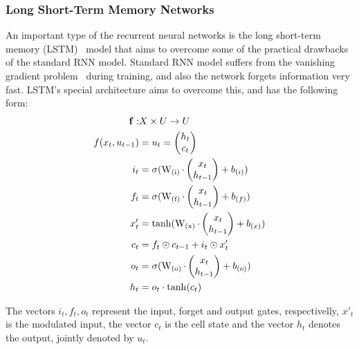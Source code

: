 \documentclass[runningheads,a4paper]{llncs}
\begin{document}
\subsubsection{Long Short-Term Memory Networks}
\label{sec:lstm}
An important type of the recurrent neural networks is the long short-term memory (LSTM)~\cite{hochreiter1997long} model that aims to overcome some of the practical drawbacks of the standard RNN model. Standard RNN model suffers from the vanishing gradient problem~\cite{bengio1994learning} during training, and also the network forgets information very fast. LSTM's special architecture aims to overcome this, and has the following form:
\begin{align*}
\bf{f}: & X \times U \rightarrow U \\ %
f(x_t, u_{t-1}) & = u_t = \begin{pmatrix}
h_t \\
c_t
\end{pmatrix} \\
i_t &= \sigma(\operatorname{W_{(i)}} \cdot \begin{pmatrix}
x_t \\
h_{t-1}
\end{pmatrix} + b_{(i)}) \\
f_t &= \sigma(\operatorname{W_{(f)}} \cdot \begin{pmatrix}
x_t \\
h_{t-1}
\end{pmatrix} + b_{(f)}) \\
x'_t &= \operatorname{tanh}(\operatorname{W_{(x)}} \cdot \begin{pmatrix}
x_t \\
h_{t-1}
\end{pmatrix} + b_{(x)}) \\
c_t &= f_t \odot c_{t-1} + i_t \odot x'_t \\
o_t &= \sigma(\operatorname{W_{(o)}} \cdot \begin{pmatrix}
x_t \\
h_{t-1}
\end{pmatrix} + b_{(o)}) \\
h_t &= o_t \cdot \operatorname{tanh}(c_t)
\end{align*}

The vectors $i_t, f_t, o_t$ represent the input, forget and output gates, respectivelly, $x'_t$ is the modulated input, the vector $c_t$ is the cell state and the vector $h_t$ denotes the output, jointly denoted by $u_t$.
\end{document}
